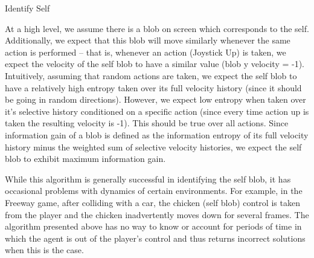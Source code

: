 \documentclass{article}
\begin{document}
\begin{algorithm}
\caption{Identify Self}
\label{alg:idself}
\begin{algorithmic}
  \STATE $possible\_actions \leftarrow $ set of actions applicable to this game
  \STATE $current\_blobs \leftarrow $ set of blobs in the current game frame
  \STATE $ActionHistory \leftarrow \{a_0...a_n\}$ 
  \STATE $vHistory_b \leftarrow \{v_0...v_n\}$ 
  \STATE $H_b \leftarrow H(vHistory)}$ \COMMENT{Information entropy of $b$'s velocity history}
  \FOR{action $a \in possible\_actions$}
  \STATE $vHistory_{(b|a)} \leftarrow \{vHistory_b[t] ~\forall_t: ActionHist[t] == a\}$ \COMMENT{set of $b$'s velocities for timesteps in which action $a$ was taken}
  \STATE $H_{(b|a)} \leftarrow H(vHistory_{(b|a)})}$ \COMMENT{Information entropy of $b$'s velocity history given action $a$ was taken}
  \ENDFOR
  \STATE $InfoGain_b \leftarrow H_b - sum(p_a * H_{(b|a)})$ \COMMENT{$p_a$ is probability of action $a$ based on observed frequency} 
  \ENDFOR
  \RETURN $arg\_max_{b \in current\_blobs}(InfoGain_b)$ \COMMENT{Return blob with max information gain}
\end{algorithmic}
\end{algorithm}

At a high level, we assume there is a blob on screen which corresponds to the self. Additionally, we expect that this blob will move similarly whenever the same action is performed -- that is, whenever an action (Joystick Up) is taken, we expect the velocity of the self blob to have a similar value (blob y velocity = -1). Intuitively, assuming that random actions are taken, we expect the self blob to have a relatively high entropy taken over its full velocity history (since it should be going in random directions). However, we expect low entropy when taken over it's selective history conditioned on a specific action (since every time action up is taken the resulting velocity is -1). This should be true over all actions. Since information gain of a blob is defined as the information entropy of its full velocity history minus the weighted sum of selective velocity histories, we expect the self blob to exhibit maximum information gain. 

While this algorithm is generally successful in identifying the self blob, it has occasional problems with dynamics of certain environments. For example, in the Freeway game, after colliding with a car, the chicken (self blob) control is taken from the player and the chicken inadvertently moves down for several frames. The algorithm presented above has no way to know or account for periods of time in which the agent is out of the player's control and thus returns incorrect solutions when this is the case. 
\end{document}
